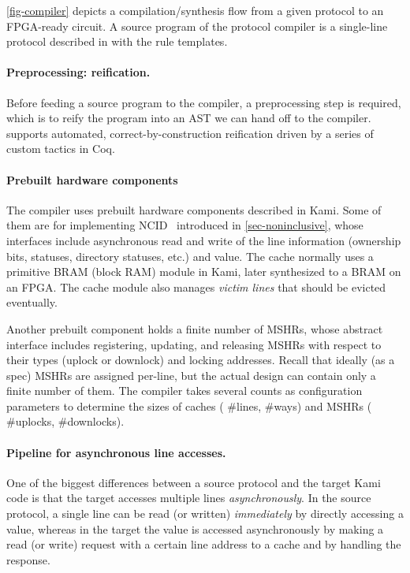 \documentclass[sigplan,10pt,review,anonymous,screen]{acmart}\settopmatter{printfolios=true,printccs=false,printacmref=false}
\begin{document}
\autoref{fig-compiler} depicts a compilation/synthesis flow from a given \hemiola{} protocol to an FPGA-ready circuit.
A source program of the protocol compiler is a single-line protocol described in \hemiola{} with the rule templates.

\paragraph{Preprocessing: reification.}

Before feeding a \hemiola{} source program to the compiler, a preprocessing step is required, which is to reify the program into an AST we can hand off to the compiler.
\hemiola{} supports automated, correct-by-construction reification driven by a series of custom tactics in Coq.

\paragraph{Prebuilt hardware components}
The compiler uses prebuilt hardware components described in Kami.
Some of them are for implementing NCID~\cite{Zhao:2010} introduced in \autoref{sec-noninclusive}, whose interfaces include asynchronous read and write of the line information (ownership bits, statuses, directory statuses, etc.) and value.
The cache normally uses a primitive BRAM (block RAM) module in Kami, later synthesized to a BRAM on an FPGA.
The cache module also manages \emph{victim lines} that should be evicted eventually.

Another prebuilt component holds a finite number of MSHRs, whose abstract interface includes registering, updating, and releasing MSHRs with respect to their types (uplock or downlock) and locking addresses.
Recall that ideally (as a spec) MSHRs are assigned per-line, but the actual design can contain only a finite number of them.
The compiler takes several counts as configuration parameters to determine the sizes of caches (\eg{} \#lines, \#ways) and MSHRs (\eg{} \#uplocks, \#downlocks).

\paragraph{Pipeline for asynchronous line accesses.}

One of the biggest differences between a source \hemiola{} protocol and the target Kami code is that the target accesses multiple lines \emph{asynchronously}.
In the source protocol, a single line can be read (or written) \emph{immediately} by directly accessing a value, whereas in the target the value is accessed asynchronously by making a read (or write) request with a certain line address to a cache and by handling the response.
\end{document}
